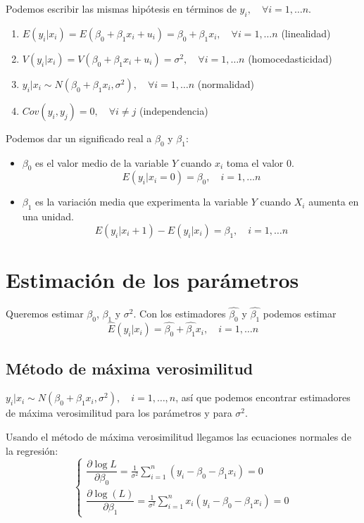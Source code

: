 Podemos escribir las mismas hipótesis en términos de $y_i, \quad \forall i = 1, \dots n$.
\begin{enumerate}
    \item $E(y_i | x_i) = E(\beta_0 + \beta_1x_i + u_i) = \beta_0 + \beta_1x_i, \quad \forall i = 1, \dots n$ (linealidad)
    \item $V(y_i | x_i) = V(\beta_0 + \beta_1x_i + u_i) = \sigma^2, \quad \forall i = 1, \dots n$ (homocedasticidad)
    \item $y_i | x_i \sim N(\beta_0 + \beta_1x_i, \sigma^2), \quad \forall i = 1, \dots n$ (normalidad)
    \item $Cov(y_i, y_j) = 0, \quad \forall i \neq j$ (independencia)
\end{enumerate}

Podemos dar un significado real a $\beta_0$ y $\beta_1$:
\begin{itemize}
    \item $\beta_0$ es el valor medio de la variable $Y$ cuando $x_i$ toma el valor 0.
          $$E(y_i | x_i = 0) = \beta_0, \quad i = 1, \dots n$$
    \item $\beta_1$ es la variación media que experimenta la variable $Y$ cuando $X_i$ aumenta en una unidad.
          $$E(y_i | x_i+1) - E(y_i | x_i) = \beta_1, \quad i = 1, \dots n$$
\end{itemize}

\section{Estimación de los parámetros}
Queremos estimar $\beta_0$, $\beta_1$ y $\sigma^2$.
Con los estimadores $\hat{\beta_0}$ y $\hat{\beta_1}$ podemos estimar $$\hat{E}(y_i | x_i) = \hat{\beta_0} + \hat{\beta_1}x_i, \quad i = 1, \dots n$$

\subsection*{Método de máxima verosimilitud}
$y_i | x_i \sim N(\beta_0 + \beta_1x_i, \sigma^2), \quad i = 1, \dots, n$, así que podemos encontrar estimadores de máxima verosimilitud para los parámetros y para $\sigma^2$.

Usando el método de máxima verosimilitud llegamos las ecuaciones normales de la regresión:
$$\begin{cases}
        \dfrac{\partial \log{L}}{\partial \beta_0} = \frac{1}{\sigma^2} \sum_{i=1}^n (y_i - \beta_0 - \beta_1x_i) = 0 \\
        \dfrac{\partial \log(L)}{\partial \beta_1} = \frac{1}{\sigma^2} \sum_{i=1}^n x_i(y_i - \beta_0 - \beta_1x_i) = 0
    \end{cases}$$


